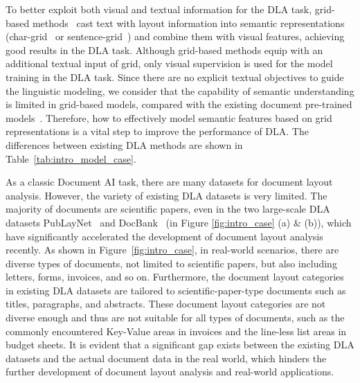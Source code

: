 \documentclass[10pt,twocolumn,letterpaper]{article}
\begin{document}
To better exploit both visual and textual information for the DLA task, grid-based methods~\cite{yang2017learning,kaplan2021combining,zhang2021vsr} cast text with layout information into  semantic representations (char-grid~\cite{katti2018chargrid,kaplan2021combining} or sentence-grid~\cite{yang2017learning,zhang2021vsr}) and combine them with visual features,
achieving good results in the DLA task.
Although grid-based methods equip with an additional textual input of grid, only visual supervision is used for the model training in the DLA task.
Since there are no explicit textual objectives to guide the linguistic modeling, 
we consider that the capability of semantic understanding is limited in grid-based models, 
compared with the existing document pre-trained models~\cite{huang2022layoutlmv3}.
Therefore, how to effectively model semantic features based on grid representations is a vital step to improve the performance of DLA.
The differences between existing DLA methods are shown in Table~\ref{tab:intro_model_case}. 


As a classic Document AI task, there are many datasets for document layout analysis.
However, the variety of existing DLA datasets is very limited.
The majority of documents are scientific papers, even in the two large-scale DLA datasets PubLayNet~\cite{zhong2019publaynet} and DocBank~\cite{li2020docbank} (in Figure \ref{fig:intro_case} (a) \& (b)), which have significantly accelerated the development of document layout analysis recently.
As shown in Figure~\ref{fig:intro_case}, in real-world scenarios, there are diverse types of documents, not limited to scientific papers, but also including letters, forms, invoices, and so on.
Furthermore, the document layout categories in existing DLA datasets are tailored to scientific-paper-type documents such as titles, paragraphs, and abstracts.
These document layout categories are not diverse enough and thus are not suitable for all types of documents, such as the commonly encountered Key-Value areas in invoices and the line-less list areas in budget sheets.
It is evident that a significant gap exists between the existing DLA datasets and the actual document data in the real world, which hinders the further development of document layout analysis and real-world applications.
\end{document}
